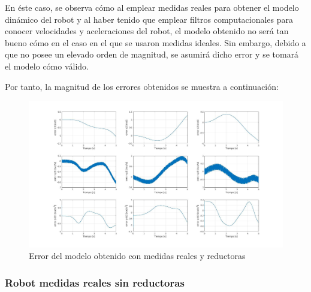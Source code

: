 En éste caso, se observa cómo al emplear medidas reales para obtener el modelo dinámico del robot y al haber tenido que emplear filtros computacionales para conocer velocidades y aceleraciones del robot, el modelo obtenido no será tan bueno cómo en el caso en el que se usaron medidas ideales. Sin embargo, debido a que no posee un elevado orden de magnitud, se asumirá dicho error y se tomará el modelo cómo válido.

\newpage
Por tanto, la magnitud de los errores obtenidos se muestra a continuación:

\begin{figure}[h!]
	\centering
	\includegraphics[width=1\textwidth]{EstimacParam_SisModError_In1_RealCR}
	\caption{Error del modelo obtenido con medidas reales y reductoras}
\end{figure}

\subsubsection{Robot medidas reales sin reductoras}
